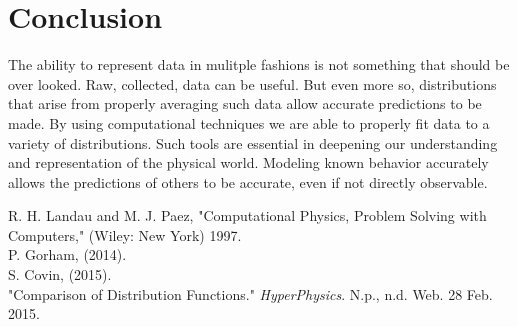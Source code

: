 \documentclass[11pt]{article}
\begin{document}
\section{Conclusion}

The ability to represent data in mulitple fashions is not something that should be over looked.  Raw, collected, data can be 
useful.  But even more so, distributions that arise from properly averaging such data allow accurate predictions to be made.  
By using computational techniques we are able to properly fit data to a variety of distributions.  Such tools are essential 
in deepening our understanding and representation of the physical world.  Modeling known behavior accurately allows the 
predictions of others to be accurate, even if not directly observable.



\setlength{\parindent}{0cm}

\begin{thebibliography}{99}  %

 R. H. Landau and M. J. Paez, "Computational Physics, Problem Solving with Computers,"
(Wiley: New York) 1997.
\\
 P. Gorham, (2014).
\\
 S. Covin, (2015).
\\
 "Comparison of Distribution Functions." \textit{HyperPhysics}. N.p., n.d. Web. 28 Feb. 2015.


\end{thebibliography}
\end{document}
